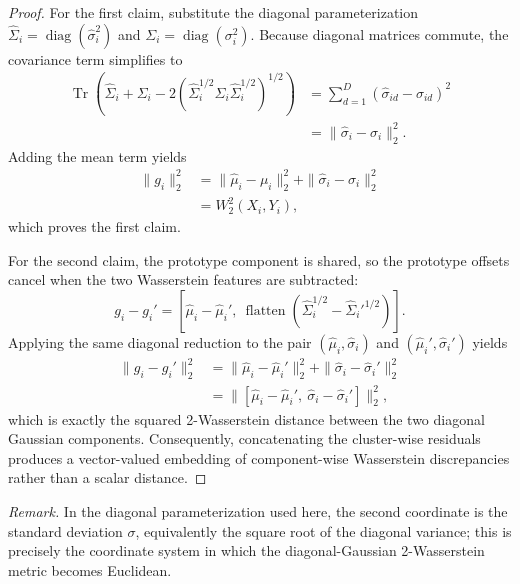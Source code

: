 \documentclass[journal]{IEEEtran}
\DeclareMathOperator{\flatten}{flatten}
\begin{document}
\begin{proof}
For the first claim, substitute the diagonal parameterization \(\hat{\Sigma}_i = \operatorname{diag}(\hat{\sigma}_i^2)\) and \(\Sigma_i = \operatorname{diag}(\sigma_i^2)\). Because diagonal matrices commute, the covariance term simplifies to
\begin{align}
\operatorname{Tr}\!\left(\hat{\Sigma}_i + \Sigma_i - 2\left(\hat{\Sigma}_i^{1/2}\Sigma_i\hat{\Sigma}_i^{1/2}\right)^{1/2}\right)
&= \sum_{d=1}^D (\hat{\sigma}_{id}-\sigma_{id})^2 \nonumber\\
&= \|\hat{\sigma}_i-\sigma_i\|_2^2.
\end{align}
Adding the mean term yields
\begin{align}
\|g_i\|_2^2
&= \|\hat{\mu}_i-\mu_i\|_2^2 + \|\hat{\sigma}_i-\sigma_i\|_2^2 \nonumber\\
&= W_2^2(X_i,Y_i),
\end{align}
which proves the first claim.

For the second claim, the prototype component is shared, so the prototype offsets cancel when the two Wasserstein features are subtracted:
\[
g_i - g_i' = [\hat{\mu}_i-\hat{\mu}_i',\ \flatten(\hat{\Sigma}_i^{1/2}-\hat{\Sigma}_i'^{1/2})].
\]
Applying the same diagonal reduction to the pair \((\hat{\mu}_i,\hat{\sigma}_i)\) and \((\hat{\mu}_i',\hat{\sigma}_i')\) yields
\begin{align}
\|g_i-g_i'\|_2^2
&= \|\hat{\mu}_i-\hat{\mu}_i'\|_2^2 + \|\hat{\sigma}_i-\hat{\sigma}_i'\|_2^2 \nonumber\\
&= \|[\hat{\mu}_i-\hat{\mu}_i',\ \hat{\sigma}_i-\hat{\sigma}_i']\|_2^2,
\end{align}
which is exactly the squared 2-Wasserstein distance between the two diagonal Gaussian components. Consequently, concatenating the cluster-wise residuals produces a vector-valued embedding of component-wise Wasserstein discrepancies rather than a scalar distance.
\end{proof}

\noindent\textit{Remark.} In the diagonal parameterization used here, the second coordinate is the standard deviation \(\sigma\), equivalently the square root of the diagonal variance; this is precisely the coordinate system in which the diagonal-Gaussian 2-Wasserstein metric becomes Euclidean.
\end{document}
